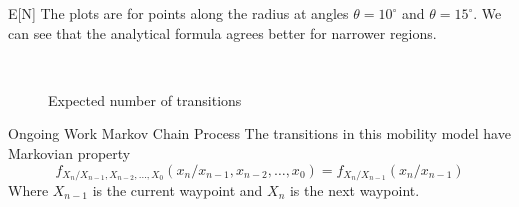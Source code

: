 \documentclass{beamer}
\begin{document}
\begin{frame}{E[N]}
The plots are for points along the radius at angles $\theta = 10^{\circ}$ and $\theta = 15^{\circ}$. We can see that the analytical formula agrees better for narrower regions.

\begin{figure}[ht!]
     \begin{center}
%
        \\ %
%
    \end{center}
	\caption[Expected number of transitions]{Expected number of transitions}%
   \label{fig:EN}
\end{figure}
\end{frame}


\begin{frame}{Ongoing Work} {Markov Chain Process}
The transitions in this mobility model have Markovian property 
\begin{equation*}
	f_{X_n/X_{n-1},X_{n-2},\ldots,X_0}(x_n/x_{n-1},x_{n-2},\ldots,x_{0}) = f_{X_n/X_{n-1}}(x_n/x_{n-1})
\end{equation*}
Where $X_{n-1}$ is the current waypoint and $X_n$ is the next waypoint. \\
\end{frame}
\end{document}
